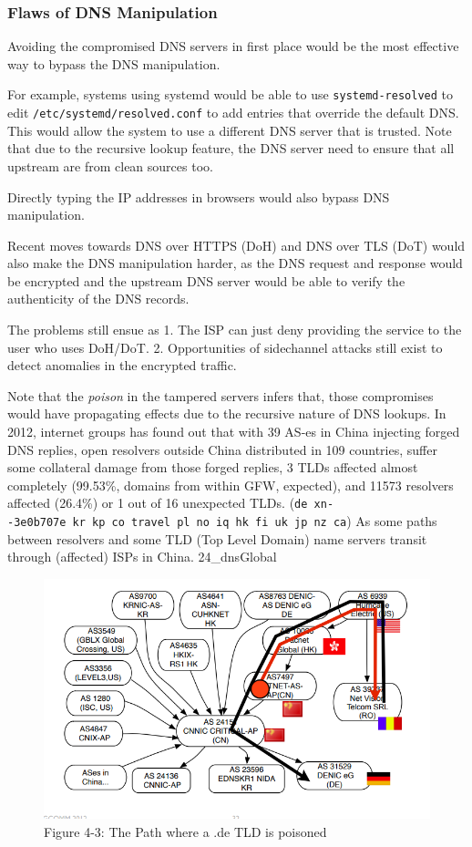 \hypertarget{flaws-of-dns-manipulation}{%
\subsubsection{Flaws of DNS
Manipulation}\label{flaws-of-dns-manipulation}}

Avoiding the compromised DNS servers in first place would be the most
effective way to bypass the DNS manipulation.

For example, systems using systemd would be able to use
\texttt{systemd-resolved} to edit \texttt{/etc/systemd/resolved.conf} to
add entries that override the default DNS. This would allow the system
to use a different DNS server that is trusted. Note that due to the
recursive lookup feature, the DNS server need to ensure that all
upstream are from clean sources too.

Directly typing the IP addresses in browsers would also bypass DNS
manipulation.

Recent moves towards DNS over HTTPS (DoH) and DNS over TLS (DoT) would
also make the DNS manipulation harder, as the DNS request and response
would be encrypted and the upstream DNS server would be able to verify
the authenticity of the DNS records.

The problems still ensue as 1. The ISP can just deny providing the
service to the user who uses DoH/DoT. 2. Opportunities of sidechannel
attacks still exist to detect anomalies in the encrypted traffic.

Note that the \emph{poison} in the tampered servers infers that, those
compromises would have propagating effects due to the recursive nature
of DNS lookups. In 2012, internet groups has found out that with 39
AS-es in China injecting forged DNS replies, open resolvers outside
China distributed in 109 countries, suffer some collateral damage from
those forged replies, 3 TLDs affected almost completely (99.53\%,
domains from within GFW, expected), and 11573 resolvers affected
(26.4\%) or 1 out of 16 unexpected TLDs.
(\texttt{de\ xn-\/-3e0b707e\ kr\ kp\ co\ travel\ pl\ no\ iq\ hk\ fi\ uk\ jp\ nz\ ca})
As some paths between resolvers and some TLD (Top Level Domain) name
servers transit through (affected) ISPs in China. 24\_dnsGlobal

\begin{figure}
\centering
\includegraphics{res/4.3-de-poison.png}
\caption{Figure 4-3: The Path where a .de TLD is poisoned}
\end{figure}

